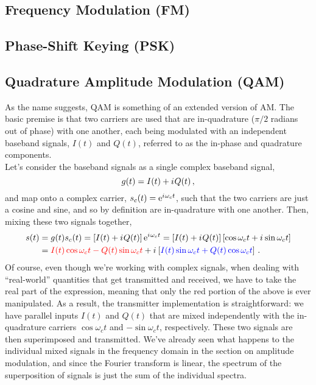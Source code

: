 \subsection{Frequency Modulation (FM)}
%

\subsection{Phase-Shift Keying (PSK)}
%

\subsection{Quadrature Amplitude Modulation (QAM)}
%
As the name suggests, QAM is something of an extended version of AM. The basic
premise is that two carriers are used that are in-quadrature ($\pi/2$ radians
out of phase) with one another, each being modulated with an independent
baseband signals, $I(t)$ and $Q(t)$, referred to as the in-phase and quadrature
components.\\
%
Let's consider the baseband signals as a single complex baseband signal,
%
\begin{displaymath}
  g(t) = I(t) + {i\mkern1mu} Q(t) \,,
\end{displaymath}
%
and map onto a complex carrier, $s_c(t) = \mathrm{e}^{{i\mkern1mu}\omega_c t}$, such that the two
carriers are just a cosine and sine, and so by definition are in-quadrature with
one another. Then, mixing these two signals together,
%
\begin{align*}
  s(t) &= g(t) s_c(t) = \left[I(t) + {i\mkern1mu} Q(t)\right]\mathrm{e}^{{i\mkern1mu}\omega_c t} =
    \left[I(t) + {i\mkern1mu} Q(t)\right]\left[ \cos \omega_c t + {i\mkern1mu}\sin\omega_c t\right] \\
  &= {\color{red}{I(t)\cos\omega_c t - Q(t)\sin\omega_c t}} + {i\mkern1mu}\left[
    {\color{blue}{I(t)\sin\omega_c t + Q(t)\cos\omega_c t}}
  \right] \,.
\end{align*}
%
Of course, even though we're working with complex signals, when dealing with
``real-world'' quantities that get transmitted and received, we have to take the
real part of the expression, meaning that only the red portion of the above is
ever manipulated. As a result, the transmitter implementation is
straightforward: we have parallel inputs $I(t)$ and $Q(t)$ that are mixed
independently with the in-quadrature carriers $\cos\omega_c t$ and
$-\sin\omega_ct$, respectively. These two signals are then superimposed and
transmitted. We've already seen what happens to the individual mixed signals in
the frequency domain in the section on amplitude modulation, and since the
Fourier transform is linear, the spectrum of the superposition of signals is
just the sum of the individual spectra.\\

